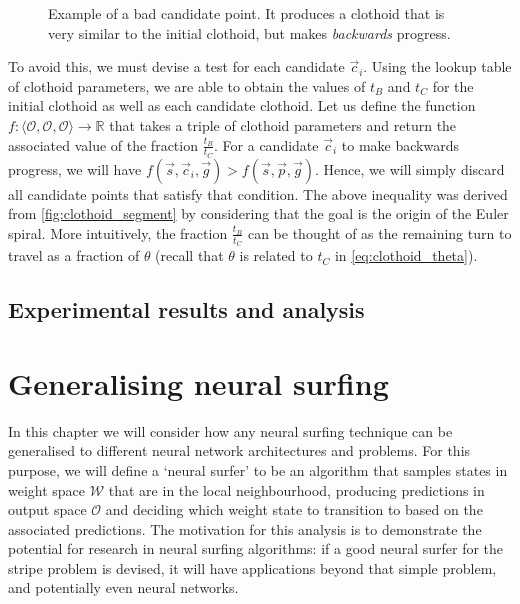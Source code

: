 \begin{figure}
    \caption{Example of a bad candidate point. It produces a clothoid that is very similar to the initial clothoid, but makes \textit{backwards} progress.}
    \label{fig:adaptive_clothoid_bad_sample}
\end{figure}
To avoid this, we must devise a test for each candidate $\vec{c}_i$.
Using the lookup table of clothoid parameters, we are able to obtain the values of $t_B$ and $t_C$ for the initial clothoid as well as each candidate clothoid.
Let us define the function $f : \langle \mathcal{O}, \mathcal{O}, \mathcal{O} \rangle \rightarrow \mathbb{R}$ that takes a triple of clothoid parameters and return the associated value of the fraction $\frac{t_B}{t_C}$.
For a candidate $\vec{c}_i$ to make backwards progress, we will have $f(\vec{s}, \vec{c}_i, \vec{g}) > f(\vec{s}, \vec{p}, \vec{g})$.
Hence, we will simply discard all candidate points that satisfy that condition.
The above inequality was derived from \ref{fig:clothoid_segment} by considering that the goal is the origin of the Euler spiral.
More intuitively, the fraction $\frac{t_B}{t_C}$ can be thought of as the remaining turn to travel as a fraction of $\theta$ (recall that $\theta$ is related to $t_C$ in \ref{eq:clothoid_theta}).

\section{Experimental results and analysis}


\chapter{Generalising neural surfing}
\label{chap:generalising}
In this chapter we will consider how any neural surfing technique can be generalised to different neural network architectures and problems.
For this purpose, we will define a `neural surfer' to be an algorithm that samples states in weight space $\mathcal{W}$ that are in the local neighbourhood, producing predictions in output space $\mathcal{O}$ and deciding which weight state to transition to based on the associated predictions.
The motivation for this analysis is to demonstrate the potential for research in neural surfing algorithms: if a good neural surfer for the stripe problem is devised, it will have applications beyond that simple problem, and potentially even neural networks.

